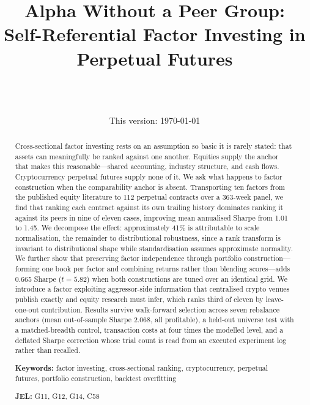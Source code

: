 \documentclass[11pt,letterpaper]{article}
\title{\textbf{Alpha Without a Peer Group:\\
Self-Referential Factor Investing in Perpetual Futures}}
\author{\AUTHORNAME\\ \small \AUTHORAFFIL\\ \small \texttt{\AUTHOREMAIL}}
\date{This version: \today}
\begin{document}
\maketitle

\begin{abstract}
\noindent
Cross-sectional factor investing rests on an assumption so basic it is rarely
stated: that assets can meaningfully be ranked against one another. Equities
supply the anchor that makes this reasonable---shared accounting, industry
structure, and cash flows. Cryptocurrency perpetual futures supply none of it.
We ask what happens to factor construction when the comparability anchor is
absent. Transporting ten factors from the published equity literature to 112
perpetual contracts over a 363-week panel, we find that ranking each contract
against its own trailing history dominates ranking it against its peers in nine
of eleven cases, improving mean annualised Sharpe from 1.01 to 1.45. We
decompose the effect: approximately 41\% is attributable to scale normalisation,
the remainder to distributional robustness, since a rank transform is invariant
to distributional shape while standardisation assumes approximate normality. We
further show that preserving factor independence through portfolio
construction---forming one book per factor and combining returns rather than
blending scores---adds 0.665 Sharpe ($t = 5.82$) when both constructions are
tuned over an identical grid. We introduce a factor exploiting aggressor-side
information that centralised crypto venues publish exactly and equity research
must infer, which ranks third of eleven by leave-one-out contribution. Results survive walk-forward selection across seven rebalance
anchors (mean out-of-sample Sharpe 2.068, all profitable), a held-out universe
test with a matched-breadth control, transaction costs at four times the
modelled level, and a deflated Sharpe correction whose trial count is read from
an executed experiment log rather than recalled.

\medskip
\noindent\textbf{Keywords:} factor investing, cross-sectional ranking,
cryptocurrency, perpetual futures, portfolio construction, backtest overfitting

\noindent\textbf{JEL:} G11, G12, G14, C58

\medskip
\noindent{}
\end{abstract}
\end{document}
